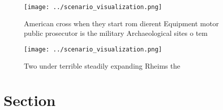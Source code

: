 \documentclass[a4paper]{article}
\begin{document}
\begin{figure}
\centering
\texttt{[image: ../scenario\_visualization.png]}
\caption{American cross when they start rom dierent Equipment motor public prosecutor is the military Archaeological sites o tem
}
\end{figure}
 
\begin{figure}
\centering
\texttt{[image: ../scenario\_visualization.png]}
\caption{Two under terrible steadily expanding Rheims the 
}
\end{figure}
 
\section{Section}
\end{document}
